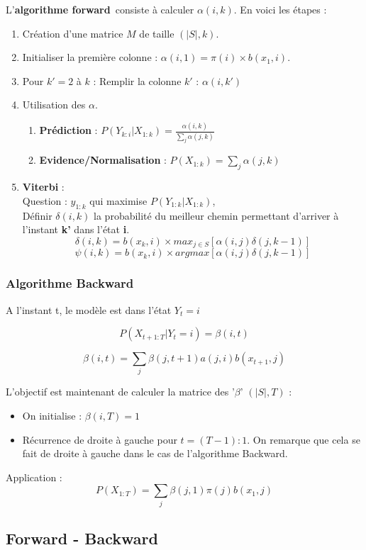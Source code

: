 \documentclass{article}
\begin{document}
L'\textbf{algorithme forward} consiste à calculer $\alpha(i, k)$. En voici les étapes : 
\begin{enumerate}
\item Création d'une matrice $M$ de taille $(|S|, k)$.
\item Initialiser la première colonne : $\alpha(i, 1) = \pi(i) \times b(x_1, i) $.
\item Pour $k' = 2$ à $k$ : Remplir la colonne $k'$ : $\alpha(i, k')$
\item Utilisation des $\alpha$.
    \begin{enumerate}
    \item \textbf{Prédiction} : $P(Y_{k:i} | X_{1:k}) = \frac{\alpha(i, k)}{\sum_j \alpha(j, k)}$
    \item \textbf{Evidence/Normalisation} : $P(X_{1:k}) = \sum_j \alpha(j, k)$
    \end{enumerate}
\item \textbf{Viterbi} : \\
Question : $y_{1:k}$ qui maximise $P(Y_{1:k} | X_{1:k})$, \\
Définir $\delta(i, k)$ la probabilité du  meilleur chemin permettant d'arriver à l'instant \textbf{k'} dans l'état \textbf{i}.
$$ \delta(i, k) = b(x_k, i) \times max_{j \in S} [ \alpha(i, j) \delta(j, k-1) ] $$
$$ \psi(i, k) = b(x_k, i) \times argmax [ \alpha(i, j) \delta(j, k-1) ] $$
\end{enumerate}

\subsubsection{Algorithme Backward}

A l'instant t, le modèle est dans l'état $Y_t = i$

\[ P(X_{t+1 : T} | Y_t = i) = \beta(i, t) \]

\[ \beta(i, t) = \sum_j \beta(j, t+1) a(j, i) b(x_{t+1}, j) \]

L'objectif est maintenant de calculer la matrice des '$\beta$' $(|S|, T)$ :
\begin{itemize}
\item On initialise : $\beta(i, T) = 1$
\item Récurrence de droite à gauche pour $t = (T-1):1$. On remarque que cela se fait de droite à gauche dans le cas de l'algorithme Backward.
\end{itemize}
Application : 
$$ P(X_{1:T}) = \sum_j \beta(j, 1) \pi(j) b(x_1, j) $$

\subsection{Forward - Backward}
\end{document}
